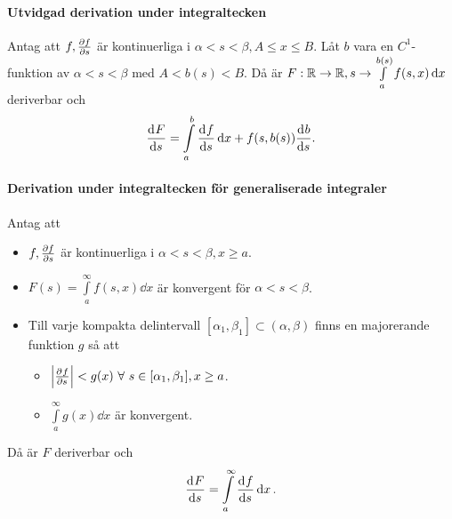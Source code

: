 \proof

\paragraph{Utvidgad derivation under integraltecken}
Antag att $f, \pdv{f}{s}$ är kontinuerliga i $\alpha < s < \beta, A\leq x\leq B$. Låt $b$ vara en $C^1$-funktion av $\alpha < s < \beta$ med $A < b(s) < B$. Då är $F:\mathbb{R}\to\mathbb{R}, s\to\int\limits_{a}^{b(s)}f(s, x)\dd{x}$ deriverbar och
\begin{align*}
	\dv[]{F}{s} (s) = \int\limits_{a}^{b}\dv[]{f}{s} (s, x)\dd{x} + f(s, b(s))\dv[]{b}{s} (s).
\end{align*}

\paragraph{Derivation under integraltecken för generaliserade integraler}
Antag att 
\begin{itemize}
	\item $f, \pdv{f}{s}$ är kontinuerliga i $\alpha < s < \beta, x\geq a$.
	\item $F(s) = \int\limits_{a}^{\infty}f(s, x)\dd{x}$ är konvergent för $\alpha < s < \beta$.
	\item Till varje kompakta delintervall $[\alpha_1, \beta_1]\subset (\alpha, \beta)$ finns en majorerande funktion $g$ så att
	\begin{itemize}
		\item $\abs{\pdeval{f}{s}{s, x}} < g(x)\ \forall\ s\in [\alpha_1, \beta_1], x\geq a$.
		\item $\int\limits_{a}^{\infty}g(x)\dd{x}$ är konvergent.
	\end{itemize}
\end{itemize}
Då är $F$ deriverbar och
\begin{align*}
	\dv[]{F}{s} (s) = \int\limits_{a}^{\infty}\dv[]{f}{s} (s, x)\dd{x}.
\end{align*}

\proof